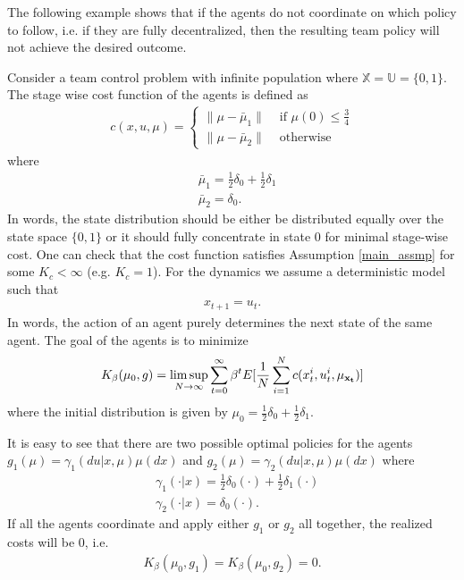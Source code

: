 \documentclass[twoside,11pt]{article}
\begin{document}
The following example shows that if the agents do not coordinate on which policy to follow, i.e. if they are fully decentralized, then the resulting team policy will not achieve the desired outcome.
\begin{example}\label{dec_counter}
Consider a team control problem with infinite population where $\mathds{X}=\mathds{U}=\{0,1\}$. The stage wise cost function of the agents is defined as
\begin{align*}
c(x,u,\mu) = \begin{cases}
\|\mu-\bar{\mu}_1\|& \text{ if } \mu(0)\leq \frac{3}{4}\\
\|\mu-\bar{\mu}_2\|& \text{ otherwise}
\end{cases}
\end{align*} 
where 
\begin{align*}
&\bar{\mu}_1=\frac{1}{2}\delta_0 + \frac{1}{2}\delta_1\\
&\bar{\mu}_2 =\delta_0.
\end{align*}
In words, the state distribution should be either be distributed equally over the state space $\{0,1\}$  or it should fully concentrate in state $0$ for minimal stage-wise cost. One can check that the cost function satisfies Assumption  \ref{main_assmp} for some $K_c<\infty$ (e.g. $K_c=1$).  For the dynamics we assume a deterministic model such that
\begin{align*}
x_{t+1}=u_t.
\end{align*}
In words, the action of an agent purely determines the next state of the same agent. The goal of the agents is to minimize
\begin{align*}
K_\beta(\mu_0 ,g)  =\limsup_{N\to \infty} \sum_{t=0}^\infty\beta^t E [\frac{1}{N}\sum_{i=1}^N c(x_t^i,u_t^i,\mu_{\bf x_t})] 
\end{align*}
where the initial distribution is given by $\mu_0 = \frac{1}{2}\delta_0 + \frac{1}{2}\delta_1$.


It is easy to see that there are two possible optimal policies for the agents $g_1(\mu)= \gamma_1(du|x,\mu)\mu(dx)$ and $g_2(\mu)= \gamma_2(du|x,\mu)\mu(dx)$  where
\begin{align*}
&\gamma_1(\cdot|x)= \frac{1}{2}\delta_0(\cdot) + \frac{1}{2} \delta_1(\cdot)\\
&\gamma_2(\cdot|x) = \delta_0(\cdot).
\end{align*} 
If all the agents coordinate and apply either $g_1$ or $g_2$ all together, the realized costs will be $0$, i.e.
\begin{align*}
K_\beta(\mu_0,g_1)=K_\beta(\mu_0,g_2) =0.
\end{align*}


\end{example}
\end{document}
